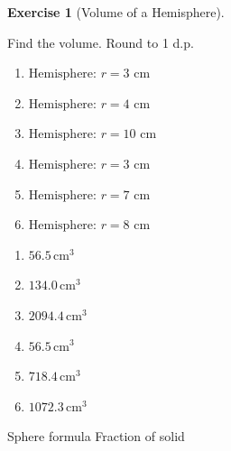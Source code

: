 \documentclass[
  letterpaper,
  DIV=11,
  numbers=noendperiod]{scrreprt}
\theoremstyle{definition}
\newtheorem{exercise}{Exercise}[chapter]
\theoremstyle{remark}
\begin{document}
\begin{exercise}[Volume of a
Hemisphere]\protect\hypertarget{exr-cur-9}{}\label{exr-cur-9}

Find the volume. Round to 1 d.p.

\begin{enumerate}
\def\labelenumi{\alph{enumi})}
\item
  \(\text{Hemisphere: }r=3\text{ cm}\)
\item
  \(\text{Hemisphere: }r=4\text{ cm}\)
\item
  \(\text{Hemisphere: }r=10\text{ cm}\)
\item
  \(\text{Hemisphere: }r=3\text{ cm}\)
\item
  \(\text{Hemisphere: }r=7\text{ cm}\)
\item
  \(\text{Hemisphere: }r=8\text{ cm}\)
\end{enumerate}

\begin{tcolorbox}[enhanced jigsaw, opacitybacktitle=0.6, coltitle=black, arc=.35mm, colframe=quarto-callout-tip-color-frame, colback=white, bottomrule=.15mm, left=2mm, colbacktitle=quarto-callout-tip-color!10!white, titlerule=0mm, opacityback=0, title=\textcolor{quarto-callout-tip-color}{\faLightbulb}\hspace{0.5em}{🔍 View Solution}, leftrule=.75mm, breakable, rightrule=.15mm, bottomtitle=1mm, toptitle=1mm, toprule=.15mm]

\begin{enumerate}
\def\labelenumi{\alph{enumi})}
\item
  \(56.5\,\text{cm}^{3}\)
\item
  \(134.0\,\text{cm}^{3}\)
\item
  \(2094.4\,\text{cm}^{3}\)
\item
  \(56.5\,\text{cm}^{3}\)
\item
  \(718.4\,\text{cm}^{3}\)
\item
  \(1072.3\,\text{cm}^{3}\)
\end{enumerate}

\end{tcolorbox}

{Sphere formula} {Fraction of solid}

\end{exercise}
\end{document}
